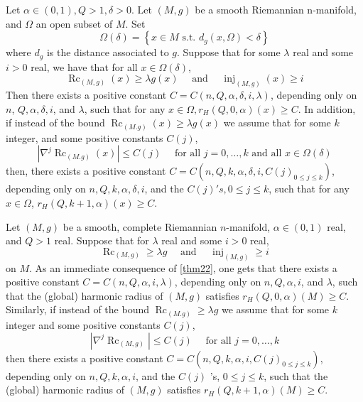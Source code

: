 \documentclass[12pt,hyperref,a4paper,UTF8]{ctexart}
\begin{document}
\begin{Theorem}
Let $\alpha \in(0,1), Q>1, \delta>0$. Let $(M, g)$ be a smooth Riemannian n-manifold, and $\Omega$ an open subset of $M$. Set
$$
\Omega(\delta)=\left\{x \in M \text { s.t. } d_g(x, \Omega)<\delta\right\}
$$
where $d_g$ is the distance associated to $g$. Suppose that for some $\lambda$ real and some $i>0$ real, we have that for all $x \in \Omega(\delta)$,
$$
\operatorname{Rc}_{(M, g)}(x) \geq \lambda g(x) \quad \text { and } \quad \operatorname{inj}_{(M, g)}(x) \geq i
$$
Then there exists a positive constant $C=C(n, Q, \alpha, \delta, i, \lambda)$, depending only on $n$, $Q, \alpha, \delta, i$, and $\lambda$, such that for any $x \in \Omega, r_H(Q, 0, \alpha)(x) \geq C$. In addition, if instead of the bound $\operatorname{Rc}_{(M . g)}(x) \geq \lambda g(x)$ we assume that for some $k$ integer, and some positive constants $C(j)$,
$$
\left|\nabla^j \operatorname{Rc}_{(M . g)}(x)\right| \leq C(j) \quad \text { for all } j=0, \ldots, k \text { and all } x \in \Omega(\delta)
$$
then, there exists a positive constant $C=C\left(n, Q, k, \alpha, \delta, i, C(j)_{0 \leq j \leq k}\right)$, depending only on $n, Q, k, \alpha, \delta, i$, and the $C(j) ' s, 0 \leq j \leq k$, such that for any $x \in \Omega$, $r_H(Q, k+1, \alpha)(x) \geq C$.
\label{thm22}
\end{Theorem}

Let $(M, g)$ be a smooth, complete Riemannian $n$-manifold, $\alpha \in(0,1)$ real, and $Q>1$ real. Suppose that for $\lambda$ real and some $i>0$ real,
$$
\operatorname{Rc}_{(M, g)} \geq \lambda g \quad \text { and } \quad \operatorname{inj}_{(M, g)} \geq i
$$
on $M$. As an immediate consequence of \autoref{thm22}, one gets that there exists a positive constant $C=C(n, Q, \alpha, i, \lambda)$, depending only on $n, Q, \alpha, i$, and $\lambda$, such that the (global) harmonic radius of $(M, g)$ satisfies $r_H(Q, 0, \alpha)(M) \geq C$. Similarly, if instead of the bound $\operatorname{Rc}_{(M . g)} \geq \lambda g$ we assume that for some $k$ integer and some positive constants $C(j)$,
$$
\left|\nabla^j \operatorname{Rc}_{(M, g)}\right| \leq C(j) \quad \text { for all } j=0, \ldots, k
$$
then there exists a positive constant $C=C\left(n, Q, k, \alpha, i, C(j)_{0 \leq j \leq k}\right)$, depending only on $n, Q, k, \alpha, i$, and the $C(j)$ 's, $0 \leq j \leq k$, such that the (global) harmonic radius of $(M, g)$ satisfies $r_H(Q, k+1, \alpha)(M) \geq C$.
\end{document}
